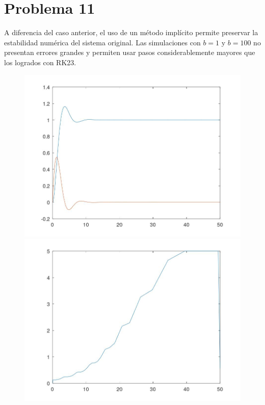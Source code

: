 \documentclass[a4paper,12pt]{article}
\begin{document}
\section*{Problema 11}

A diferencia del caso anterior, el uso de un método implícito permite preservar la estabilidad numérica del sistema original. Las simulaciones con \( b = 1 \) y \( b = 100 \) no presentan errores grandes y permiten usar pasos considerablemente mayores que los logrados con RK23.


\begin{figure}[H]
\centering

\begin{minipage}[b]{0.48\textwidth}
    \centering
    \includegraphics[width=\textwidth]{img/ej11_1.jpeg}
\end{minipage}
\hfill
\begin{minipage}[b]{0.48\textwidth}
    \centering
    \includegraphics[width=\textwidth]{img/ej11_2.jpeg}
\end{minipage}


\end{figure}
\end{document}
